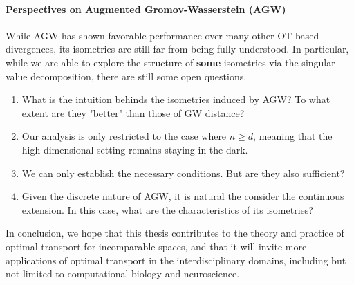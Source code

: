 \paragraph{Perspectives on Augmented Gromov-Wasserstein (AGW)}
While AGW has shown favorable performance over many other OT-based divergences,
its isometries are still far from being fully understood. In particular, while
we are able to explore the structure of \textbf{some} isometries via the singular-value
decomposition, there are still some open questions.
\begin{enumerate}
    \item What is the intuition behinds the isometries induced by AGW?
    To what extent are they "better" than those of GW distance?
    \item Our analysis is only restricted to the case where $n \geq d$, meaning that
    the high-dimensional setting remains staying in the dark.
    \item We can only establish the necessary conditions. But are they also sufficient?
    \item Given the discrete nature of AGW, it is natural the consider the continuous extension.
    In this case, what are the characteristics of its isometries?
\end{enumerate}

In conclusion, we hope that this thesis contributes to the theory and practice of optimal transport for
incomparable spaces, and that it will invite more applications of optimal transport in the interdisciplinary domains,
including but not limited to computational biology and neuroscience.

\vfill
